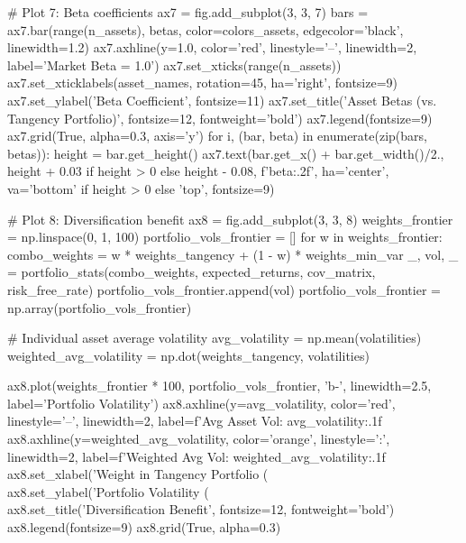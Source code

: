 \documentclass[a4paper, 11pt]{article}
\begin{document}
\begin{pycode}
# Plot 7: Beta coefficients
ax7 = fig.add_subplot(3, 3, 7)
bars = ax7.bar(range(n_assets), betas, color=colors_assets, edgecolor='black', linewidth=1.2)
ax7.axhline(y=1.0, color='red', linestyle='--', linewidth=2, label='Market Beta = 1.0')
ax7.set_xticks(range(n_assets))
ax7.set_xticklabels(asset_names, rotation=45, ha='right', fontsize=9)
ax7.set_ylabel('Beta Coefficient', fontsize=11)
ax7.set_title('Asset Betas (vs. Tangency Portfolio)', fontsize=12, fontweight='bold')
ax7.legend(fontsize=9)
ax7.grid(True, alpha=0.3, axis='y')
for i, (bar, beta) in enumerate(zip(bars, betas)):
    height = bar.get_height()
    ax7.text(bar.get_x() + bar.get_width()/2., height + 0.03 if height > 0 else height - 0.08,
            f'{beta:.2f}', ha='center', va='bottom' if height > 0 else 'top', fontsize=9)

# Plot 8: Diversification benefit
ax8 = fig.add_subplot(3, 3, 8)
weights_frontier = np.linspace(0, 1, 100)
portfolio_vols_frontier = []
for w in weights_frontier:
    combo_weights = w * weights_tangency + (1 - w) * weights_min_var
    _, vol, _ = portfolio_stats(combo_weights, expected_returns, cov_matrix, risk_free_rate)
    portfolio_vols_frontier.append(vol)
portfolio_vols_frontier = np.array(portfolio_vols_frontier)

# Individual asset average volatility
avg_volatility = np.mean(volatilities)
weighted_avg_volatility = np.dot(weights_tangency, volatilities)

ax8.plot(weights_frontier * 100, portfolio_vols_frontier, 'b-', linewidth=2.5,
        label='Portfolio Volatility')
ax8.axhline(y=avg_volatility, color='red', linestyle='--', linewidth=2,
           label=f'Avg Asset Vol: {avg_volatility:.1f}\\%
ax8.axhline(y=weighted_avg_volatility, color='orange', linestyle=':', linewidth=2,
           label=f'Weighted Avg Vol: {weighted_avg_volatility:.1f}\\%
ax8.set_xlabel('Weight in Tangency Portfolio (\\%
ax8.set_ylabel('Portfolio Volatility (\\%
ax8.set_title('Diversification Benefit', fontsize=12, fontweight='bold')
ax8.legend(fontsize=9)
ax8.grid(True, alpha=0.3)


\end{pycode}
\end{document}
